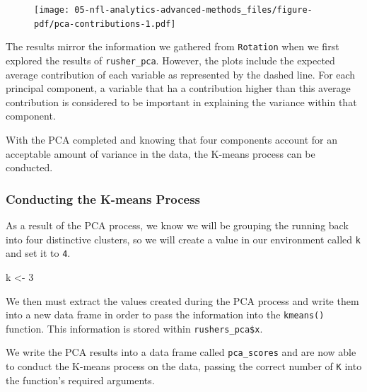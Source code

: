 \documentclass[
  letterpaper,
]{krantz}
\newenvironment{Shaded}{\begin{snugshade}}{\end{snugshade}}
\newcommand{\DecValTok}[1]{\textcolor[rgb]{0.68,0.00,0.00}{#1}}
\newcommand{\NormalTok}[1]{\textcolor[rgb]{0.00,0.23,0.31}{#1}}
\newcommand{\OtherTok}[1]{\textcolor[rgb]{0.00,0.23,0.31}{#1}}
\newcommand{\SpecialCharTok}[1]{\textcolor[rgb]{0.37,0.37,0.37}{#1}}
\begin{document}
\begin{figure}[H]

{\centering \texttt{[image: 05-nfl-analytics-advanced-methods\_files/figure-pdf/pca-contributions-1.pdf]}

}

\end{figure}

The results mirror the information we gathered from \texttt{Rotation}
when we first explored the results of \texttt{rusher\_pca}. However, the
plots include the expected average contribution of each variable as
represented by the dashed line. For each principal component, a variable
that ha a contribution higher than this average contribution is
considered to be important in explaining the variance within that
component.

With the PCA completed and knowing that four components account for an
acceptable amount of variance in the data, the K-means process can be
conducted.

\hypertarget{conducting-the-k-means-process}{%
\subsubsection{Conducting the K-means
Process}\label{conducting-the-k-means-process}}

As a result of the PCA process, we know we will be grouping the running
back into four distinctive clusters, so we will create a value in our
environment called \texttt{k} and set it to \texttt{4}.

\begin{Shaded}
\begin{Highlighting}[]
\NormalTok{k }\OtherTok{\textless{}{-}} \DecValTok{3}
\end{Highlighting}
\end{Shaded}

We then must extract the values created during the PCA process and write
them into a new data frame in order to pass the information into the
\texttt{kmeans()} function. This information is stored within
\texttt{rushers\_pca\$x}.

\begin{Shaded}
\end{Shaded}

We write the PCA results into a data frame called \texttt{pca\_scores}
and are now able to conduct the K-means process on the data, passing the
correct number of \texttt{K} into the function's required arguments.
\end{document}
